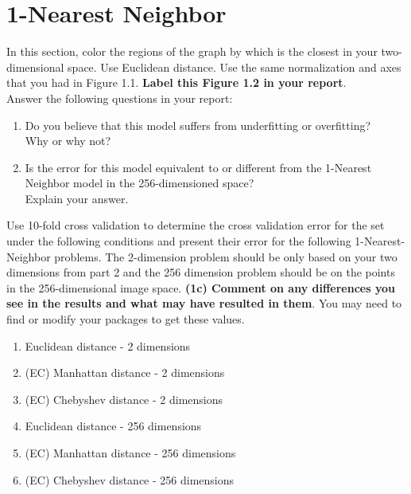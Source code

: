 \documentclass[12pt]{article}
\begin{document}
\section{1-Nearest Neighbor}
In this section, color the regions of the graph by which is the closest in your two-dimensional space. Use Euclidean distance. Use the same normalization and axes that you had in Figure 1.1.  \textbf{Label this Figure 1.2 in your report}.
\\
Answer the following questions in your report:
\begin{enumerate}
\item Do you believe that this model suffers from underfitting or overfitting? \\Why or why not?
\item Is the error for this model equivalent to or different from the 1-Nearest Neighbor model in the 256-dimensioned space?\\Explain your answer.
\end{enumerate}
Use 10-fold cross validation to determine the cross validation error for the set under the following conditions and present their error for the following 1-Nearest-Neighbor problems. The 2-dimension problem should be only based on your two dimensions from part 2 and the 256 dimension problem should be on the points in the 256-dimensional image space. \textbf{(1c) Comment on any differences you see in the results and what may have resulted in them}. You may need to find or modify your packages to get these values.
\begin{enumerate}
\item Euclidean distance - 2 dimensions
\item (EC) Manhattan distance - 2 dimensions
\item (EC) Chebyshev distance - 2 dimensions
\item Euclidean distance - 256 dimensions
\item (EC) Manhattan distance - 256 dimensions
\item (EC) Chebyshev distance - 256 dimensions
\end{enumerate}
\newpage
\end{document}
